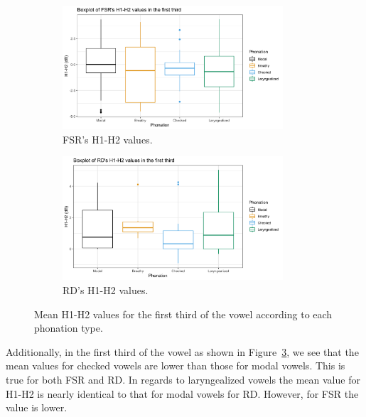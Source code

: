 \documentclass[12pt, letterpaper]{article}
\begin{document}
\begin{figure}[!ht]
	\centering
	\begin{subfigure}{.5\textwidth}
		\centering
		\includegraphics[width=0.9\textwidth]{../mean_FSR_h1h2_1st.png}
		\caption{FSR's H1-H2 values.}
		\label{fig:FSRh1h2first} 
	\end{subfigure}%
	\begin{subfigure}{.5\textwidth}
		\centering
		\includegraphics[width=0.9\textwidth]{../mean_RD_h1h2_1st.png}
		\caption{RD's H1-H2 values.}
		\label{fig:RDh1h2first} 
	\end{subfigure}
	\caption{Mean H1-H2 values for the first third of the vowel according to each phonation type. }
	\label{fig:h1h2first}
\end{figure}

Additionally, in the first third of the vowel as shown in Figure~\ref{fig:h1h2first}, we see that the mean values for checked vowels are lower than those for modal vowels. This is true for both FSR and RD. In regards to laryngealized vowels the mean value for H1-H2 is nearly identical to that for modal vowels for RD. However, for FSR the value is lower.
\end{document}
